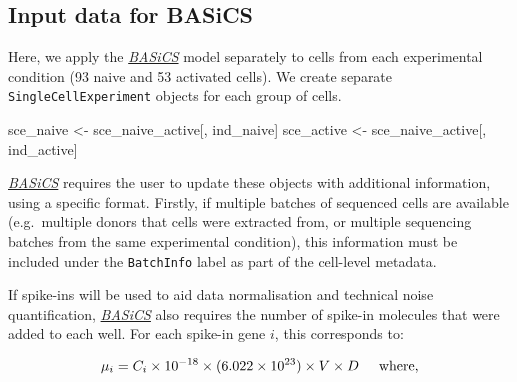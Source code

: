 \documentclass[9pt,a4paper,]{extarticle}
\newenvironment{Shaded}{\begin{snugshade}}{\end{snugshade}}
\newcommand{\KeywordTok}[1]{\textcolor[rgb]{0.13,0.29,0.53}{\textbf{#1}}}
\newcommand{\NormalTok}[1]{#1}
\newcommand{\OperatorTok}[1]{\textcolor[rgb]{0.81,0.36,0.00}{\textbf{#1}}}
\newcommand{\StringTok}[1]{\textcolor[rgb]{0.31,0.60,0.02}{#1}}
\begin{document}
\hypertarget{input-data-for-basics}{%
\subsection{Input data for BASiCS}\label{input-data-for-basics}}

Here, we apply the \emph{\href{https://bioconductor.org/packages/3.11/BASiCS}{BASiCS}} model separately to cells from each
experimental condition (93
naive and 53 activated cells).
We create separate \texttt{SingleCellExperiment} objects for each group of cells.

\begin{Shaded}
\begin{Highlighting}[]
\NormalTok{sce_naive <-}\StringTok{ }\NormalTok{sce_naive_active[, ind_naive]}
\NormalTok{sce_active <-}\StringTok{ }\NormalTok{sce_naive_active[, ind_active]}
\end{Highlighting}
\end{Shaded}

\emph{\href{https://bioconductor.org/packages/3.11/BASiCS}{BASiCS}} requires the user to update these objects with additional
information, using a specific format.
Firstly, if multiple batches of sequenced cells are available (e.g.~multiple
donors that cells were extracted from, or multiple sequencing batches from the
same experimental condition), this information must be included under the
\texttt{BatchInfo} label as part of the cell-level metadata.

\begin{Shaded}
\end{Shaded}

If spike-ins will be used to aid data normalisation and technical noise
quantification, \emph{\href{https://bioconductor.org/packages/3.11/BASiCS}{BASiCS}} also requires the number of spike-in
molecules that were added to each well.
For each spike-in gene \(i\), this corresponds to:

\[ \mu_{i} = C_i \times 10^{-18} \times (6.022 \times 10^{23}) 
\times V \times D \hspace{0.5cm} \mbox{where,} \]
\end{document}
